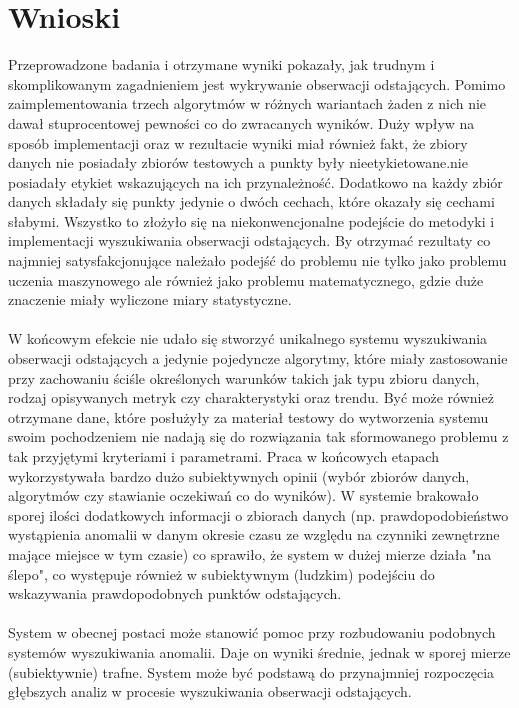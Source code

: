 \documentclass[eng,printmode]{mgr}
\begin{document}
\section{Wnioski}
Przeprowadzone badania i otrzymane wyniki pokazały, jak trudnym i skomplikowanym zagadnieniem jest wykrywanie obserwacji odstających. Pomimo zaimplementowania trzech algorytmów w różnych wariantach żaden z nich nie dawał stuprocentowej pewności co do zwracanych wyników. Duży wpływ na sposób implementacji oraz w rezultacie wyniki miał również fakt, że zbiory danych nie posiadały zbiorów testowych a punkty były nieetykietowane.nie posiadały etykiet wskazujących na ich przynależność. Dodatkowo na każdy zbiór danych składały się punkty jedynie o dwóch cechach, które okazały się cechami słabymi. Wszystko to złożyło się na niekonwencjonalne podejście do metodyki i implementacji wyszukiwania obserwacji odstających. By otrzymać rezultaty co najmniej satysfakcjonujące należało podejść do problemu nie tylko jako problemu uczenia maszynowego ale również jako problemu matematycznego, gdzie duże znaczenie miały wyliczone miary statystyczne.
\\\\
W końcowym efekcie nie udało się stworzyć unikalnego systemu wyszukiwania obserwacji odstających a jedynie pojedyncze algorytmy, które miały zastosowanie przy zachowaniu ściśle określonych warunków takich jak typu zbioru danych, rodzaj opisywanych metryk czy charakterystyki oraz trendu. Być może również otrzymane dane, które posłużyły za materiał testowy do wytworzenia systemu swoim pochodzeniem nie nadają się do rozwiązania tak sformowanego problemu z tak przyjętymi kryteriami i parametrami. Praca w końcowych etapach wykorzystywała bardzo dużo subiektywnych opinii (wybór zbiorów danych, algorytmów czy stawianie oczekiwań co do wyników). W systemie brakowało sporej ilości dodatkowych informacji o zbiorach danych (np. prawdopodobieństwo wystąpienia anomalii w danym okresie czasu ze względu na czynniki zewnętrzne mające miejsce w tym czasie) co sprawiło, że system w dużej mierze działa "na ślepo", co występuje również w subiektywnym (ludzkim) podejściu do wskazywania prawdopodobnych punktów odstających.
\\\\
System w obecnej postaci może stanowić pomoc przy rozbudowaniu podobnych systemów wyszukiwania anomalii. Daje on wyniki średnie, jednak w sporej mierze (subiektywnie) trafne. System może być podstawą do przynajmniej rozpoczęcia głębszych analiz w procesie wyszukiwania obserwacji odstających.
\end{document}
